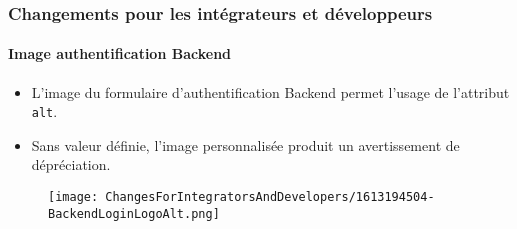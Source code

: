 %

\begin{frame}[fragile]
	\frametitle{Changements pour les intégrateurs et développeurs}
	\framesubtitle{Image authentification Backend}


	\begin{itemize}
		\item L'image du formulaire d'authentification Backend permet l'usage de l'attribut \texttt{alt}.
		\item Sans valeur définie, l'image personnalisée produit un avertissement de dépréciation.
	\end{itemize}

	\begin{figure}
		\texttt{[image: ChangesForIntegratorsAndDevelopers/1613194504-BackendLoginLogoAlt.png]}
	\end{figure}

\end{frame}

